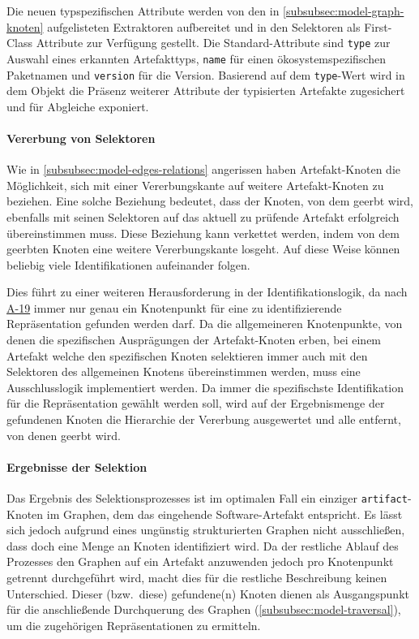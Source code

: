 Die neuen typspezifischen Attribute werden von den in \autoref{subsubsec:model-graph-knoten} aufgelisteten Extraktoren aufbereitet und in den Selektoren als First-Class Attribute zur Verfügung gestellt.
Die Standard-Attribute sind \texttt{type} zur Auswahl eines erkannten Artefakttyps, \texttt{name} für einen ökosystemspezifischen Paketnamen und \texttt{version} für die Version.
Basierend auf dem \texttt{type}-Wert wird in dem Objekt die Präsenz weiterer Attribute der typisierten Artefakte zugesichert und für Abgleiche exponiert.

\paragraph{Vererbung von Selektoren}

Wie in \autoref{subsubsec:model-edges-relations} angerissen haben Artefakt-Knoten die Möglichkeit, sich mit einer Vererbungskante auf weitere Artefakt-Knoten zu beziehen.
Eine solche Beziehung bedeutet, dass der Knoten, von dem geerbt wird, ebenfalls mit seinen Selektoren auf das aktuell zu prüfende Artefakt erfolgreich übereinstimmen muss.
Diese Beziehung kann verkettet werden, indem von dem geerbten Knoten eine weitere Vererbungskante losgeht.
Auf diese Weise können beliebig viele Identifikationen aufeinander folgen.

Dies führt zu einer weiteren Herausforderung in der Identifikationslogik, da nach \hyperref[subsec:req-graph-inner-consistency]{A-19} immer nur genau ein Knotenpunkt für eine zu identifizierende Repräsentation gefunden werden darf.
Da die allgemeineren Knotenpunkte, von denen die spezifischen Ausprägungen der Artefakt-Knoten erben, bei einem Artefakt welche den spezifischen Knoten selektieren immer auch mit den Selektoren des allgemeinen Knotens übereinstimmen werden, muss eine Ausschlusslogik implementiert werden.
Da immer die spezifischste Identifikation für die Repräsentation gewählt werden soll, wird auf der Ergebnismenge der gefundenen Knoten die Hierarchie der Vererbung ausgewertet und alle entfernt, von denen geerbt wird.

\paragraph{Ergebnisse der Selektion}

Das Ergebnis des Selektionsprozesses ist im optimalen Fall ein einziger \texttt{artifact}-Knoten im Graphen, dem das eingehende Software-Artefakt entspricht.
Es lässt sich jedoch aufgrund eines ungünstig strukturierten Graphen nicht ausschließen, dass doch eine Menge an Knoten identifiziert wird.
Da der restliche Ablauf des Prozesses den Graphen auf ein Artefakt anzuwenden jedoch pro Knotenpunkt getrennt durchgeführt wird, macht dies für die restliche Beschreibung keinen Unterschied.
Dieser (bzw.\ diese) gefundene(n) Knoten dienen als Ausgangspunkt für die anschließende Durchquerung des Graphen (\autoref{subsubsec:model-traversal}), um die zugehörigen Repräsentationen zu ermitteln.

